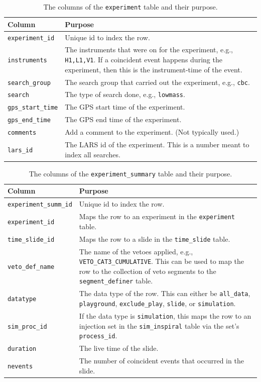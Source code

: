 \begin{table}[p]
\label{tab:experiment}
\center
\begin{tabular}{l | p{10cm}}
Column      &   Purpose     \\
\hline \hline
\texttt{experiment\_id}  &  Unique id to index the row. \\
\hline
\texttt{instruments}    &  The instruments that were on for the experiment, e.g., \texttt{H1,L1,V1}. If a coincident event happens during the experiment, then this is the instrument-time of the event.\\
\hline
\texttt{search\_group}  &  The search group that carried out the experiment, e.g., \texttt{cbc}. \\
\hline
\texttt{search}     &   The type of search done, e.g., \texttt{lowmass}. \\
\hline
\texttt{gps\_start\_time}   &   The GPS start time of the experiment. \\
\hline
\texttt{gps\_end\_time}     &   The GPS end time of the experiment. \\
\hline
\texttt{comments}   &  Add a comment to the experiment. (Not typically used.) \\
\hline
\texttt{lars\_id}   & The LARS id of the experiment. This is a number meant to index all searches. \\
\end{tabular}
\caption{The columns of the \texttt{experiment} table and their purpose.}
\end{table}

\begin{table}[p]
\label{tab:experiment_summary}
\center
\begin{tabular}{l | p{10cm}}
Column      &   Purpose     \\
\hline \hline
\texttt{experiment\_summ\_id}   &   Unique id to index the row. \\
\hline
\texttt{experiment\_id}     &   Maps the row to an experiment in the \texttt{experiment} table. \\
\hline
\texttt{time\_slide\_id}    &   Maps the row to a slide in the \texttt{time\_slide} table. \\
\hline
\texttt{veto\_def\_name}    &   The name of the vetoes applied, e.g., \texttt{VETO\_CAT3\_CUMULATIVE}. This can be used to map the row to the collection of veto segments to the \texttt{segment\_definer} table. \\
\hline
\texttt{datatype}   &   The data type of the row. This can either be \texttt{all\_data}, \texttt{playground}, \texttt{exclude\_play}, \texttt{slide}, or \texttt{simulation}. \\
\hline
\texttt{sim\_proc\_id}  &   If the data type is \texttt{simulation}, this maps the row to an injection set in the \texttt{sim\_inspiral} table via the set's \texttt{process\_id}. \\
\hline
\texttt{duration}   &   The live time of the slide. \\
\hline
\texttt{nevents}    &   The number of coincident events that occurred in the slide.
\end{tabular}
\caption{The columns of the \texttt{experiment\_summary} table and their purpose.}
\end{table}


